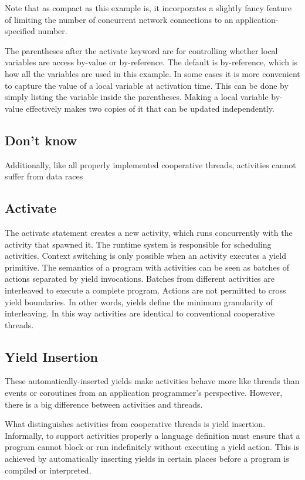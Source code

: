 \documentclass[10pt,preprint]{sigplanconf}
\begin{document}
Note that as compact as this example is, it incorporates a slightly fancy feature of limiting the number of concurrent network connections to an application-specified number.

The parentheses after the activate keyword are for controlling whether local variables are access by-value or by-reference.
The default is by-reference, which is how all the variables are used in this example.
In some cases it is more convenient to capture the value of a local variable at activation time.
This can be done by simply listing the variable inside the parentheses.
Making a local variable by-value effectively makes two copies of it that can be updated independently.

\subsection{Don't know}

Additionally, like all properly implemented cooperative threads, activities cannot suffer from data races

\cite{Boehm2011}

\subsection{Activate}

The activate statement creates a new activity, which runs concurrently with the activity that spawned it.
The runtime system is responsible for scheduling activities.
Context switching is only possible when an activity executes a yield primitive.
The semantics of a program with activities can be seen as batches of actions separated by yield invocations.
Batches from different activities are interleaved to execute a complete program.
Actions are not permitted to cross yield boundaries.
In other words, yields define the minimum granularity of interleaving.
In this way activities are identical to conventional cooperative threads.

\subsection{Yield Insertion}

These automatically-inserted yields make activities behave more like threads than events or coroutines from an application programmer's perspective.
However, there is a big difference between activities and threads.

%

What distinguishes activities from cooperative threads is yield insertion.
Informally, to support activities properly a language definition must ensure that a program cannot block or run indefinitely without executing a yield action.
This is achieved by automatically inserting yields in certain places before a program is compiled or interpreted.
\end{document}

